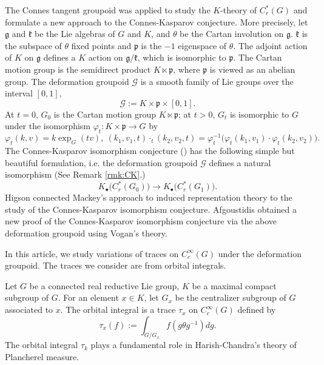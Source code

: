 \documentclass{amsproc}
\theoremstyle{definition}
\theoremstyle{remark}
\numberwithin{equation}{section}
\begin{document}
The Connes tangent groupoid was applied  \cite{BCH} to study the $K$-theory of $C^*_r(G)$ and formulate a new approach to the Connes-Kasparov conjecture. More precisely, let $\mathfrak{g}$ and $\mathfrak{k}$ be the Lie algebras of $G$ and $K$, and $\theta$ be the Cartan involution on $\mathfrak{g}$. $\mathfrak{k}$ is the subspace of $\theta$ fixed points and $\mathfrak{p}$ is the $-1$ eigenspace of $\theta$. The adjoint action of $K$ on $\mathfrak{g}$ defines a $K$ action on $\mathfrak{g}/\mathfrak{k}$, which is isomorphic to $\mathfrak{p}$. The Cartan motion group is the semidirect product $K\ltimes \mathfrak{p}$, where $\mathfrak{p}$ is viewed as an abelian group. The deformation groupoid $\mathcal{G}$ is a smooth family of Lie groups over the interval $[0,1]$,
\[
\mathcal{G}:=K\times \mathfrak{p}\times [0,1].
\]
At $t=0$, $G_0$ is the Cartan motion group $K\ltimes \mathfrak{p}$; at $t>0$, $G_t$ is isomorphic to $G$ under the isomorphism $\varphi_t: K\times \mathfrak{p}\to G$ by
\[
\varphi_t(k,v)=k\exp_G(tv),\ (k_1, v_1, t)\cdot_t (k_2, v_2, t)=\varphi^{-1}_t\big(\varphi_t(k_1, v_1)\cdot \varphi_t(k_2, v_2)\big).
\] 
The Connes-Kasparov isomorphism conjecture (\cite{wassermann,nest,lafforgue,CHST}) has the following simple but beautiful formulation, i.e. the deformation groupoid $\mathcal{G}$ defines a natural isomorphism (See Remark \ref{rmk:CK}.)
\[
K_\bullet\big(C^*_r(G_0)\big)\to K_\bullet\big(C^*_r(G_1)\big). 
\]
Higson \cite{higson-mackey} connected Mackey's approach to induced representation theory to the study of the Connes-Kasparov isomorphism conjecture. Afgoustidis \cite{afgoustidis} obtained a new proof of the Connes-Kasparov isomorphism conjecture via the above deformation groupoid using Vogan's theory. 

In this article, we study variations of traces on $C^\infty_c(G)$ under the deformation groupoid. The traces we consider are from orbital integrals.

Let $G$ be a connected real reductive Lie group,  $K$ be a maximal compact subgroup of $G$. For an element $x\in K$, let $G_x$ be the centralizer subgroup of $G$ associated to $x$. The orbital integral is a trace $\tau_x$ on $C^\infty_c(G)$ defined by 
\[
\tau_x(f):=\int_{G/G_x} f(g\theta g^{-1}) dg. 
\]
The orbital integral $\tau_k$ plays a fundamental role in Harish-Chandra's theory of Plancherel measure. 
\end{document}
